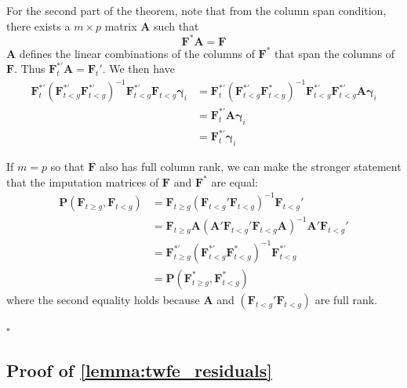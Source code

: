 \documentclass[12pt]{article}
\begin{document}
For the second part of the theorem, note that from the column span condition, there exists a $m \times p$ matrix $\bm A$ such that 
\begin{equation}
    \bm{F}^*\bm A = \bm{F}
\end{equation}
$\bm A$ defines the linear combinations of the columns of $\bm{F}^*$ that span the columns of $\bm{F}$. Thus $\bm{F}_t^{*'} \bm A = \bm{F}_t'$. We then have
\begin{align*}
    \bm{F}^{*'}_t (\bm{F}^{*'}_{t < g} \bm{F}^{*'}_{t < g})^{-1} \bm{F}^{*'}_{t < g} \bm{F}_{t < g} \bm \gamma_i
    &= \bm{F}^{*'}_t (\bm{F}^{*'}_{t < g} \bm{F}^{*}_{t < g})^{-1} \bm{F}^{*'}_{t < g} \bm{F}^{*'}_{t < g} \bm A \bm \gamma_i \\
    &= \bm{F}^{*'}_t \bm A \bm \gamma_i \\
    &= \bm{F}^{*'}_t \bm \gamma_i
\end{align*}

If $m = p$ so that $\bm{F}$ also has full column rank, we can make the stronger statement that the imputation matrices of $\bm{F}$ and $\bm{F}^{*}$ are equal: 
    \begin{align*}
        \bm P (\bm{F}_{t \geq g}, \bm{F}_{t < g}) 
        &= \bm{F}_{t \geq g} (\bm{F}_{t < g}' \bm{F}_{t < g})^{-1} \bm{F}_{t < g}' \\
        &= \bm{F}_{t \geq g} \bm A (\bm A'\bm{F}_{t < g}' \bm{F}_{t < g} \bm A)^{-1} \bm A' \bm{F}_{t < g}' \\
        &= \bm{F}^{*'}_{t \geq g} (\bm{F}^{*'}_{t < g} \bm{F}^{*}_{t < g})^{-1} \bm{F}^{*'}_{t < g} \\
        &= \bm P(\bm{F}^{*}_{t \geq g}, \bm{F}^{*}_{t < g})
    \end{align*}
    where the second equality holds because $\bm A$ and $(\bm{F}_{t < g}' \bm{F}_{t < g})$ are full rank.

$\square$

\subsection*{Proof of \autoref{lemma:twfe_residuals}}
\end{document}
